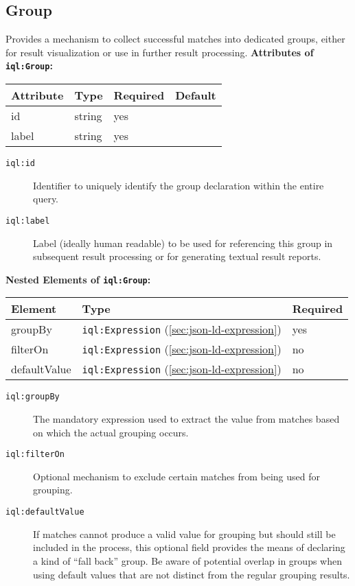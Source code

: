 \documentclass[11pt]{article}
\newcommand{\iqlns}{iql:}
\newcommand{\iqlType}[1]{\texttt{\iqlns#1}}
\newcommand{\desc}[1]{\noindent#1\newline\medskip}
\newenvironment{attributes}[1]{
\noindent\textbf{Attributes of #1:}\newline\medskip
\begin{tabular}{|p{0.3\textwidth}|p{0.20\textwidth}|p{0.20\textwidth}|p{0.17\textwidth}|}
	\hline
	\textbf{Attribute} & \textbf{Type} & \textbf{Required} & \textbf{Default} \\ 
	\hline
	\hline
}{
\end{tabular}
}
\newcommand{\attribute}[4]{
	#1 & #2 & #3 & #4 \\
	\hline
}
\newenvironment{elements}[1]{
\noindent\textbf{Nested Elements of #1:}\newline\medskip
\begin{tabular}{|p{0.3\textwidth}|p{0.42\textwidth}|p{0.17\textwidth}|}
	\hline
	\textbf{Element} & \textbf{Type} & \textbf{Required} \\ 
	\hline
	\hline
}{
\end{tabular}
}
\newcommand{\element}[3]{
#1 & #2 & #3 \\
\hline
}
\begin{document}
\subsection{Group}
\label{sec:json-ld-group}
\desc{Provides a mechanism to collect successful matches into dedicated groups, either for result visualization or use in further result processing.}
\begin{attributes}{\iqlType{Group}}
	\attribute{id}{string}{yes}{}
	\attribute{label}{string}{yes}{}
\end{attributes}
\begin{description}
	\item[\iqlType{id}] Identifier to uniquely identify the group declaration within the entire query.
	\item[\iqlType{label}] Label (ideally human readable) to be used for referencing this group in subsequent result processing or for generating textual result reports.
\end{description}
\begin{elements}{\iqlType{Group}}
	\element{groupBy}{\iqlType{Expression} (\ref{sec:json-ld-expression})}{yes}
	\element{filterOn}{\iqlType{Expression} (\ref{sec:json-ld-expression})}{no}
	\element{defaultValue}{\iqlType{Expression} (\ref{sec:json-ld-expression})}{no}
\end{elements}
\begin{description}
	\item[\iqlType{groupBy}] The mandatory expression used to extract the value from matches based on which the actual grouping occurs.
	\item[\iqlType{filterOn}] Optional mechanism to exclude certain matches from being used for grouping.
	\item[\iqlType{defaultValue}] If matches cannot produce a valid value for grouping but should still be included in the process, this optional field provides the means of declaring a kind of ``fall back'' group. Be aware of potential overlap in groups when using default values that are not distinct from the regular grouping results.
\end{description}
\end{document}

